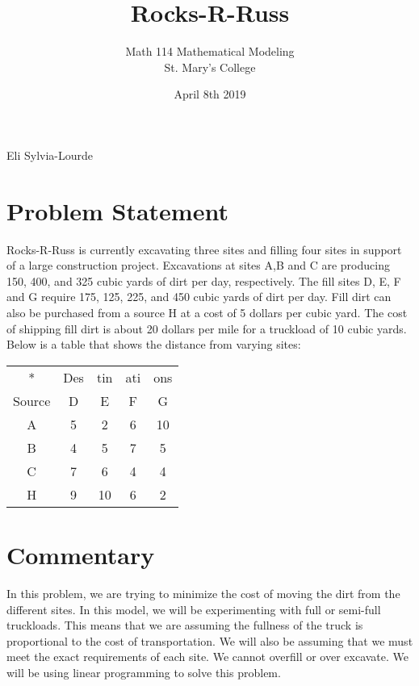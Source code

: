 \documentclass[12pt]{article} %
\title{Rocks-R-Russ}
\author{Math 114 Mathematical Modeling\\St. Mary's College}
\date{April 8th 2019}
\newcommand{\authors}{Eli Sylvia-Lourde}
\begin{document}
\hfill\authors %
{\let\newpage\relax\maketitle} %

\section*{Problem Statement}
Rocks-R-Russ is currently excavating three sites and filling four sites in support of a large construction project. Excavations at sites A,B and C are producing 150, 400, and 325 cubic yards of dirt per day, respectively. The fill sites D, E, F and G require 175, 125, 225, and 450 cubic yards of dirt per day. Fill dirt can also be purchased from a source H at a cost of 5 dollars per cubic yard. The cost of shipping fill dirt is about 20 dollars per mile for a truckload of 10 cubic yards. Below is a table that shows the distance from varying sites:


\begin{center}
\begin{tabular}{ |c|c|c|c|c| }
 \hline
  * & Des & tin & ati & ons \\
  Source & D & E & F & G \\
  A & 5 & 2 & 6 & 10 \\
  B & 4 & 5 & 7 & 5  \\
  C & 7 & 6 & 4 & 4  \\
  H & 9 & 10 & 6 & 2  \\
 \hline
\end{tabular}
\end{center}

\section*{Commentary}
In this problem, we are trying to minimize the cost of moving the dirt from the different sites. In this model, we will be experimenting with full or semi-full truckloads. This means that we are assuming the fullness of the truck is proportional to the cost of transportation. We will also be assuming that we must meet the exact requirements of each site. We cannot overfill or over excavate. We will be using linear programming to solve this problem.
\end{document}
